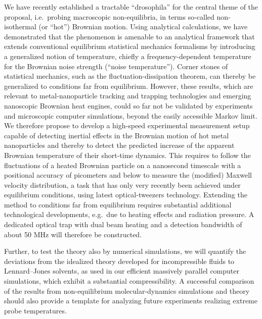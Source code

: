 \begin{workpackage}[id=WPactive,wphases=0-48,
  short=Active Particle Suspensions,%
  title=Probing Active Particle Suspensions with Colloids and Polymers,
  lead=Leipzig,
  LeipzigRM=12]
\begin{tasklist}
\begin{task}[title=Noise Temperature,id=task2,PM=15,lead=Leipzig,wphases=12-42!0.5]
We have recently established a tractable ``drosophila'' for the central theme of the
proposal, i.e.\ probing macroscopic non-equilibria, in terms so-called non-isothermal (or
``hot'') Brownian motion.
%
Using analytical calculations, we have demonstrated that the phenomenon is amenable to an
analytical framework that extends conventional equilibrium statistical mechanics formalisms
by introducing a generalized notion of temperature, chiefly a frequency-dependent
temperature for the Brownian noise strength (``noise temperature'').
%
Corner stones of statistical mechanics, such as the fluctuation-dissipation theorem, can
thereby be generalized to conditions far from equilibrium.  However, these results, which
are relevant to metal-nanoparticle tracking and trapping technologies and emerging
nanoscopic Brownian heat engines, could so far not be validated by experiments and
microscopic computer simulations, beyond the easily accessible Markov limit.
%
We therefore propose to develop a high-speed experimental measurement setup capable of
detecting inertial effects in the Brownian motion of hot metal nanoparticles and thereby to
detect the predicted increase of the apparent Brownian temperature of their short-time
dynamics.
%
This requires to follow the fluctuations of a heated Brownian particle on a nanosecond
timescale with a positional accuracy of picometers and below to measure the (modified)
Maxwell velocity distribution, a task that has only very recently been achieved under
equilibrium conditions, using latest optical-tweezers technology.
%
Extending the method to conditions far from equilibrium requires substantial additional
technological developments, e.g.\ due to heating effects and radiation pressure.
%
A dedicated optical trap with dual beam heating and a detection bandwidth of about 50 MHz
will therefore be constructed.

Further, to test the theory also by numerical simulations, we will quantify the deviations
from the idealized theory developed for incompressible fluids to Lennard--Jones solvents, as
used in our efficient massively parallel computer simulations, which exhibit a substantial
compressibility.
%
A successful comparison of the results from non-equilibrium molecular-dynamics simulations
and theory should also provide a template for analyzing future experiments realizing extreme
probe temperatures.
\end{task}


\end{tasklist}
\end{workpackage}
